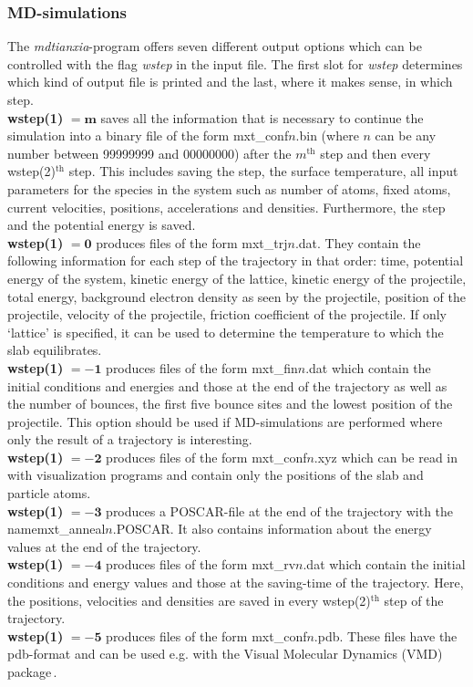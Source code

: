 \documentclass[twoside, 11pt, titlepage, captions=nooneline, a4paper, headsepline]{scrbook}%
\newcommand{\9}{\mathrm}
\newcommand{\0}{\,\mathrm}
\begin{document}
\subsubsection{MD-simulations}
The \textit{mdtianxia}-program offers seven different output options which can be controlled with the flag \textit{wstep} in the input file. The first slot for \textit{wstep} determines which kind of output file is printed and the last, where it makes sense, in which step.
\\
\textbf{wstep(1)} $\mathbf{=m}$ saves all the information that is necessary to continue the simulation into a binary file of the form mxt\_conf$n$.bin (where $n$ can be any number between 99999999 and 00000000) after the $m^\mathrm{th}$ step and then every wstep(2)$^\mathrm{th}$ step. This includes saving the step, the surface temperature, all input parameters for the species in the system such as number of atoms, fixed atoms, current velocities, positions, accelerations and densities. Furthermore, the step and the potential energy is saved.\\
\textbf{wstep(1)} $\mathbf{=0}$ produces files of the form mxt\_trj$n$.dat. They contain the following information for each step of the trajectory in that order:
time, potential energy of the system, kinetic energy of the lattice, kinetic energy of the projectile, total energy, background electron density as seen by the projectile, position of the projectile, velocity of the projectile, friction coefficient of the projectile. If only `lattice' is specified, it can be used to determine the temperature to which the slab equilibrates.\\
\textbf{wstep(1)} $\mathbf{=-1}$ produces files of the form mxt\_fin$n$.dat which contain the initial conditions and energies and those at the end of the trajectory as well as the number of bounces, the first five bounce sites and the lowest position of the projectile. This option should be used if MD-simulations are performed where only the result of a trajectory is interesting.\\ 
\textbf{wstep(1)} $\mathbf{=-2}$ produces files of the form mxt\_conf$n$.xyz which can be read in with visualization programs and contain only the positions of the slab and particle atoms.\\
\textbf{wstep(1)} $\mathbf{=-3}$ produces a POSCAR-file at the end of the trajectory with the name\linebreak mxt\_anneal$n$.POSCAR. It also contains information about the energy values at the end of the trajectory.\\
\textbf{wstep(1)} $\mathbf{=-4}$ produces files of the form mxt\_rv$n$.dat which contain the initial conditions and energy values and those at the saving-time of the trajectory. Here, the positions, velocities and densities are saved in every wstep(2)$^\mathrm{th}$ step of the trajectory.\\
\textbf{wstep(1)} $\mathbf{=-5}$ produces files of the form mxt\_conf$n$.pdb. These files have the pdb-format and can be used e.g. with the Visual Molecular Dynamics (VMD) package\,\cite{humphrey1996}.
\end{document}
